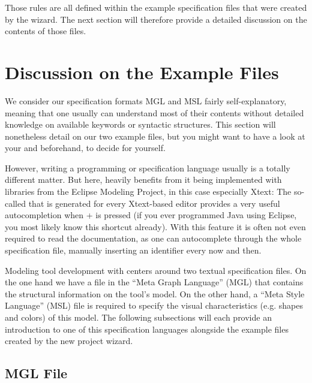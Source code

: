 \documentclass[a4paper,american,12pt]{scrreprt}
\begin{document}
Those rules are all defined within the example \cinco specification files that
were created by the wizard. The next section will therefore provide a detailed
discussion on the contents of those files.

\section{Discussion on the Example Files}
\label{sec:examplefiles}

We consider our specification formats MGL and MSL fairly self-explanatory,
meaning that one usually can understand most of their contents without detailed
knowledge on available keywords or syntactic structures. This section
will nonetheless detail on our two example files, but you might want to have a look at
your  and  beforehand, to decide for
yourself. 

However, writing a programming or specification language usually is a totally
different matter. But here, \cinco heavily benefits from it being implemented
with libraries from the Eclipse Modeling Project, in this case especially Xtext:
The so-called  that is generated for every Xtext-based
editor provides a very useful autocompletion when
+ is pressed (if you ever programmed Java using
Eclipse, you most likely know this shortcut already). With this feature it is
often not even required to read the documentation, as one can autocomplete
through the whole specification file, manually inserting an identifier every now and
then.

Modeling tool development with \cinco centers around two textual specification
files. On the one hand we have a file in the ``Meta Graph Language'' (MGL) that
contains the structural information on the tool's model. On the other hand, a
``Meta Style Language'' (MSL) file\footnotemark{} is required to specify the
visual characteristics (e.g.  shapes and colors) of this model. The following
subsections will each provide an introduction to one of this specification
languages alongside the example files created by the new project wizard.


\subsection{MGL File} \label{sec:mgl} 
\end{document}

